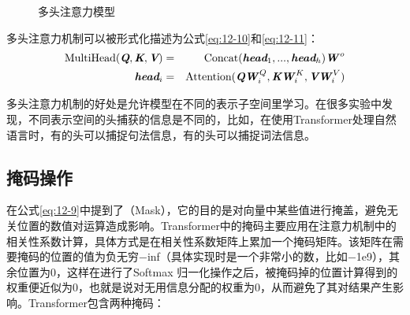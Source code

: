 \begin{figure}[htp]
\centering

\caption{多头注意力模型}
\label{fig:12-12}
\end{figure}

\parinterval 多头注意力机制可以被形式化描述为公式\eqref{eq:12-10}和\eqref{eq:12-11}：
\begin{eqnarray}
\textrm{MultiHead}(\textbf{\em Q}, \textbf{\em K} , \textbf{\em V})& = & \textrm{Concat} (\textbf{\em head}_1, ... , \textbf{\em head}_h ) \textbf{\em W}^{\,o} \label{eq:12-10} \\
\textbf{\em head}_i & = &\textrm{Attention} (\textbf{\em Q}\textbf{\em W}_i^{\,Q} , \textbf{\em K}\textbf{\em W}_i^{\,K}  , \textbf{\em V}\textbf{\em W}_i^{\,V} )
\label{eq:12-11}
\end{eqnarray}

\parinterval 多头注意力机制的好处是允许模型在不同的表示子空间里学习。在很多实验中发现，不同表示空间的头捕获的信息是不同的，比如，在使用Transformer处理自然语言时，有的头可以捕捉句法信息，有的头可以捕捉词法信息。


\subsection{掩码操作}

\parinterval 在公式\eqref{eq:12-9}中提到了{\small{}}（Mask），它的目的是对向量中某些值进行掩盖，避免无关位置的数值对运算造成影响。Transformer中的掩码主要应用在注意力机制中的相关性系数计算，具体方式是在相关性系数矩阵上累加一个掩码矩阵。该矩阵在需要掩码的位置的值为负无穷$-$inf（具体实现时是一个非常小的数，比如$-$1e9），其余位置为0，这样在进行了Softmax 归一化操作之后，被掩码掉的位置计算得到的权重便近似为0，也就是说对无用信息分配的权重为0，从而避免了其对结果产生影响。Transformer包含两种掩码：

